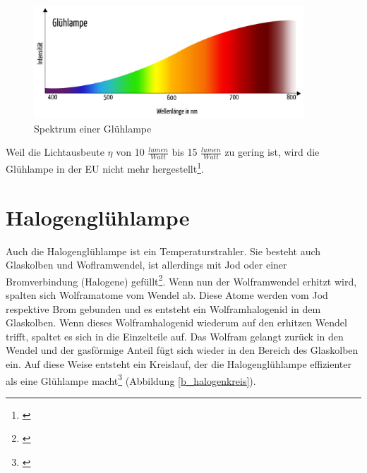 \begin{figure}[H]     %
\centering
\includegraphics[width=0.9\textwidth]{bilder/halogen} 
\caption {Spektrum einer Glühlampe\protect\footnotemark}\label{b_halogen}
\end{figure}

\noindent Weil die Lichtausbeute $\eta$ von 10 $\frac{lumen}{Watt}$ bis 15 $\frac{lumen}{Watt}$ zu gering ist, wird die Glühlampe in der EU nicht mehr hergestellt\footnote{\cite[78]{ris}}.
 
\section{Halogenglühlampe} \label{sec_halogenglühlampe}
Auch die Halogenglühlampe ist ein Temperaturstrahler. Sie besteht auch Glaskolben und Woflramwendel, ist allerdings mit Jod oder einer Bromverbindung (Halogene) gefüllt\footnote{\cite[82]{ris}}.
Wenn nun der Wolframwendel erhitzt wird, spalten sich Wolframatome vom Wendel ab. Diese Atome werden vom Jod respektive Brom gebunden und es entsteht ein Wolframhalogenid in dem Glaskolben. Wenn dieses Wolframhalogenid wiederum auf den erhitzen Wendel trifft, spaltet es sich in die Einzelteile auf. Das Wolfram gelangt zurück in den Wendel und der gasförmige Anteil fügt sich wieder in den Bereich des Glaskolben ein. Auf diese Weise entsteht ein Kreislauf, der die Halogenglühlampe effizienter als eine Glühlampe macht\footnote{\cite[83-84]{ris}} (Abbildung \ref{b_halogenkreis}).

